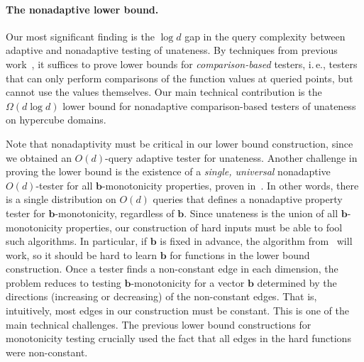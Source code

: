 \documentclass[11pt]{article}
\numberwithin{equation}{section}
\theoremstyle{definition}
\theoremstyle{plain}
\newcommand{\ie}{i.\,e.}
\newcommand{\bb}{\ensuremath{\mathbf{b}}}
\begin{document}
\paragraph{The nonadaptive lower bound.} Our most significant finding
is the $\log d$ gap in the query complexity between adaptive and
nonadaptive testing of unateness.  By techniques from previous
work~\cite{Fis04,CS14}, it suffices to prove lower bounds for
\emph{comparison-based} testers, \ie, testers that can only perform
comparisons of the function values at queried points, but cannot use
the values themselves.  Our main technical contribution is the
$\Omega(d\log d)$ lower bound for nonadaptive comparison-based testers
of unateness on hypercube domains.

Note that nonadaptivity must be critical in our lower bound construction, since
we obtained 
%
%
an 
%
$O(d)$-query adaptive tester for unateness.
%
%
%
%
Another challenge in proving the lower bound is the existence of a \emph{single, universal} nonadaptive
$O(d)$-tester for all
$\bb$-monotonicity properties, proven in~\cite{CDJS17}. In other words, there is a single
distribution on  $O(d)$ queries that defines a nonadaptive property tester for
$\bb$-monotonicity, regardless of $\bb$.
Since unateness
is the union of all $\bb$-monotonicity properties,
our construction of hard inputs must be able to fool such algorithms. In particular, if $\bb$ is fixed in advance, the algorithm from~\cite{CDJS17} will work, so it should be hard to learn $\bb$ for functions in the lower bound construction.
Once a tester finds a non-constant edge in each dimension, the problem reduces to testing $\bb$-monotonicity for a vector $\bb$ determined by the directions (increasing or decreasing) of the non-constant edges. That is, intuitively, most edges in our construction must be constant. This is one of the main technical challenges. The previous lower bound constructions for monotonicity testing \cite{BBM12,CS14} crucially used the fact that all edges in the hard functions were non-constant.
\end{document}
